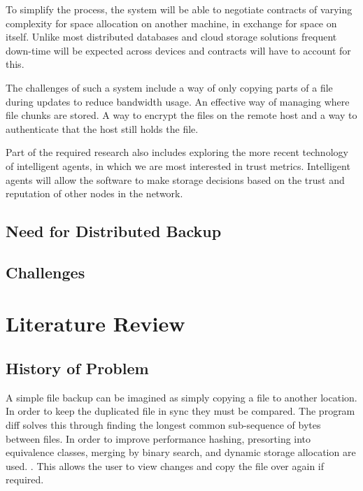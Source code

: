 \documentclass[a4paper, 11pt, twocolumn, twoside]{report}
\begin{document}
To simplify the process, the system will be able to negotiate contracts of varying complexity for space allocation on another machine, in exchange for space on itself. Unlike most distributed databases and cloud storage solutions frequent down-time will be expected across devices and contracts will have to account for this.

The challenges of such a system include a way of only copying parts of a file during updates to reduce bandwidth usage. An effective way of managing where file chunks are stored. A way to encrypt the files on the remote host and a way to authenticate that the host still holds the file.

Part of the required research also includes exploring the more recent technology of intelligent agents, in which we are most interested in trust metrics. Intelligent agents will allow the software to make storage decisions based on the trust and reputation of other nodes in the network.

\section{Need for Distributed Backup}

\section{Challenges}

\chapter{Literature Review}

\section{History of Problem}

A simple file backup can be imagined as simply copying a file to another location. In order to keep the duplicated file in sync they must be compared. The program diff solves this through finding the longest common sub-sequence of bytes between files. In order to improve performance hashing, presorting into equivalence classes, merging by binary search, and dynamic storage allocation are used. \citep{hunt1976algorithm}. This allows the user to view changes and copy the file over again if required.
\end{document}
